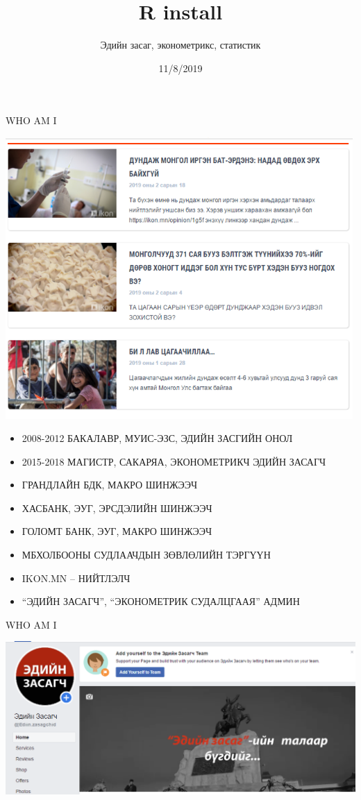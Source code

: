 \documentclass[
  ignorenonframetext,
]{beamer}
\title{R install}
\author{Эдийн засаг, эконометрикс, статистик}
\date{11/8/2019}
\providecommand{\tightlist}{%
  \setlength{\itemsep}{0pt}\setlength{\parskip}{0pt}}
\begin{document}
\frame{\titlepage}

\begin{frame}
  \tableofcontents[hideallsubsections]
\end{frame}
\begin{frame}{WHO AM I}
\protect\hypertarget{who-am-i}{}

\includegraphics[width=500px]{Picture1}

\begin{itemize}
\tightlist
\item
  { 2008-2012 БАКАЛАВР, МУИС-ЭЗС, ЭДИЙН ЗАСГИЙН ОНОЛ}
\item
  {2015-2018 МАГИСТР, САКАРЯА, ЭКОНОМЕТРИКЧ ЭДИЙН ЗАСАГЧ}
\item
  {ГРАНДЛАЙН БДК, МАКРО ШИНЖЭЭЧ}
\item
  {ХАСБАНК, ЭУГ, ЭРСДЭЛИЙН ШИНЖЭЭЧ}
\item
  {ГОЛОМТ БАНК, ЭУГ, МАКРО ШИНЖЭЭЧ}
\item
  {МБХОЛБООНЫ СУДЛААЧДЫН ЗӨВЛӨЛИЙН ТЭРГҮҮН}
\item
  {IKON.MN -- НИЙТЛЭЛЧ}
\item
  {``ЭДИЙН ЗАСАГЧ'', ``ЭКОНОМЕТРИК СУДАЛЦГААЯ'' АДМИН}
\end{itemize}

\end{frame}

\begin{frame}{WHO AM I}
\protect\hypertarget{who-am-i-1}{}

\includegraphics[width=1000px]{Picture2}

\end{frame}
\end{document}
